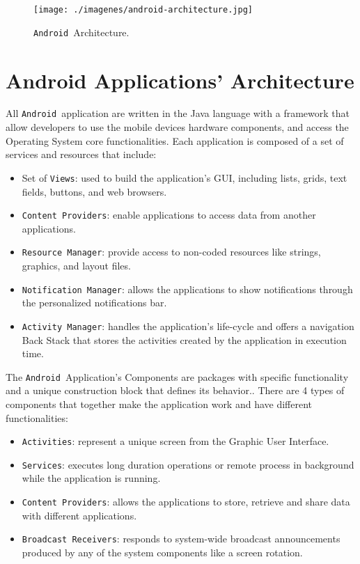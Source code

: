 \documentclass[journal]{IEEEtran}
\newcommand{\andrs}{\texttt{Android~}}
\newcommand{\rem}{\texttt{Resource Manager}}
\newcommand{\nm}{\texttt{Notification Manager}}
\newcommand{\am}{\texttt{Activity Manager}}
\newcommand{\cop}{\texttt{Content Providers}}
\newcommand{\act}{\texttt{Activities}}
\newcommand{\ser}{\texttt{Services}}
\newcommand{\bre}{\texttt{Broadcast Receivers}}
\newcommand{\vi}{\texttt{Views}}
\begin{document}
 \begin{figure}[hb]
\centering
 \texttt{[image: ./imagenes/android-architecture.jpg]}
 \caption{\andrs Architecture.} \cite{And}
\end{figure}



\section{Android Applications' Architecture}
 All \andrs application are written in the Java language with a framework that  allow developers to use the mobile devices
hardware components, and access the Operating System core functionalities. Each application is composed of a set of services and
resources that include:

\begin{itemize}
  \item  Set of \vi: used to build the application's GUI, including lists, grids, text fields, buttons, and web browsers.
  \item  \cop: enable applications to access data from another applications.
  \item  \rem: provide access to non-coded resources like strings, graphics, and layout files.
  \item  \nm: allows the applications to show notifications through the  personalized notifications bar.
  \item  \am: handles the application's life-cycle and offers a navigation Back Stack that stores the activities created by 
	      the application in execution time.
\end{itemize}



The \andrs Application's Components are packages with specific functionality and a unique construction block that defines 
its behavior\cite{And}.. There are 4 types of components that together make the application work and have different functionalities:

\begin{itemize}
  \item  \act: represent a unique screen from the Graphic User Interface.
  \item  \ser: executes long duration operations or remote process in background while the application is running.
  \item  \cop: allows the applications to store, retrieve and share data with different applications.
  \item  \bre: responds to system-wide broadcast announcements produced by any of the system components like a screen rotation.
\end{itemize}
\end{document}
